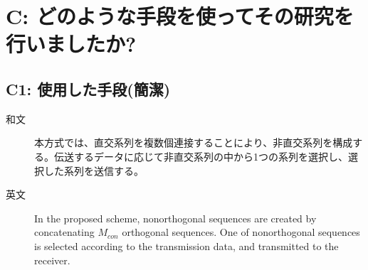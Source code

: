 ﻿\documentclass[a4j,10pt]{jarticle}
\begin{document}
\section{C: どのような手段を使ってその研究を行いましたか?}
\subsection{C1: 使用した手段(簡潔)} %
\begin{description}
 \item[和文] 本方式では、直交系列を複数個連接することにより、非直交系列を構成する。伝送するデータに応じて非直交系列の中から1つの系列を選択し、選択した系列を送信する。
%
 \item[英文] In the proposed scheme, nonorthogonal sequences are created by concatenating $M_{con}$ orthogonal sequences. One of nonorthogonal sequences is selected according to the transmission data, and transmitted to the receiver. 
\end{description}
%
\end{document}
